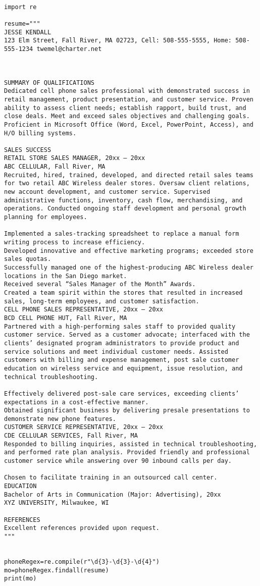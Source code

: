 \documentclass[11pt]{article}
\begin{document}
\begin{verbatim}

import re

resume="""
JESSE KENDALL
123 Elm Street, Fall River, MA 02723, Cell: 508-555-5555, Home: 508-555-1234 twemel@charter.net



SUMMARY OF QUALIFICATIONS
Dedicated cell phone sales professional with demonstrated success in retail management, product presentation, and customer service. Proven ability to assess client needs; establish rapport, build trust, and close deals. Meet and exceed sales objectives and challenging goals. Proficient in Microsoft Office (Word, Excel, PowerPoint, Access), and H/O billing systems.

SALES SUCCESS
RETAIL STORE SALES MANAGER, 20xx – 20xx
ABC CELLULAR, Fall River, MA
Recruited, hired, trained, developed, and directed retail sales teams for two retail ABC Wireless dealer stores. Oversaw client relations, new account development, and customer service. Supervised administrative functions, inventory, cash flow, merchandising, and operations. Conducted ongoing staff development and personal growth planning for employees.

Implemented a sales-tracking spreadsheet to replace a manual form writing process to increase efficiency.
Developed innovative and effective marketing programs; exceeded store sales quotas.
Successfully managed one of the highest-producing ABC Wireless dealer locations in the San Diego market.
Received several “Sales Manager of the Month” Awards.
Created a team spirit within the stores that resulted in increased sales, long-term employees, and customer satisfaction.
CELL PHONE SALES REPRESENTATIVE, 20xx – 20xx
BCD CELL PHONE HUT, Fall River, MA
Partnered with a high-performing sales staff to provided quality customer service. Served as a customer advocate; interfaced with the clients’ designated program administrators to provide product and service solutions and meet individual customer needs. Assisted customers with billing and expense management, post sale customer education on wireless service and equipment, issue resolution, and technical troubleshooting.

Effectively delivered post-sale care services, exceeding clients’ expectations in a cost-effective manner.
Obtained significant business by delivering presale presentations to demonstrate new phone features.
CUSTOMER SERVICE REPRESENTATIVE, 20xx – 20xx
CDE CELLULAR SERVICES, Fall River, MA
Responded to billing inquiries, assisted in technical troubleshooting, and performed rate plan analysis. Provided friendly and professional customer service while answering over 90 inbound calls per day.

Chosen to facilitate training in an outsourced call center.
EDUCATION
Bachelor of Arts in Communication (Major: Advertising), 20xx
XYZ UNIVERSITY, Milwaukee, WI

REFERENCES
Excellent references provided upon request.
"""


phoneRegex=re.compile(r"\d{3}-\d{3}-\d{4}")
mo=phoneRegex.findall(resume)
print(mo)

\end{verbatim}
\end{document}
